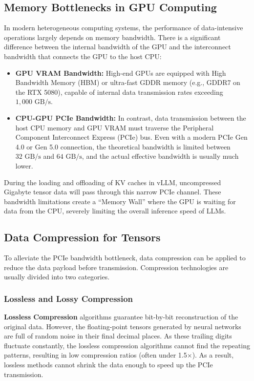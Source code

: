 \documentclass{polyu-comp}
\begin{document}
\subsection{Memory Bottlenecks in GPU Computing}
In modern heterogeneous computing systems, the performance of data-intensive operations largely depends on memory bandwidth. There is a significant difference between the internal bandwidth of the GPU and the interconnect bandwidth that connects the GPU to the host CPU:
\begin{itemize}
    \item \textbf{GPU VRAM Bandwidth:} High-end GPUs are equipped with High Bandwidth Memory (HBM) or ultra-fast GDDR memory (e.g., GDDR7 on the RTX 5080), capable of internal data transmission rates exceeding $1,000\text{ GB/s}$.
    \item \textbf{CPU-GPU PCIe Bandwidth:} In contrast, data transmission between the host CPU memory and GPU VRAM must traverse the Peripheral Component Interconnect Express (PCIe) bus. Even with a modern PCIe Gen 4.0 or Gen 5.0 connection, the theoretical bandwidth is limited between $32\text{ GB/s}$ and $64\text{ GB/s}$, and the actual effective bandwidth is usually much lower.
\end{itemize}
During the loading and offloading of KV caches in vLLM, uncompressed Gigabyte tensor data will pass through this narrow PCIe channel. These bandwidth limitations create a ``Memory Wall'' \cite{10.1145/3458817.3476205} where the GPU is waiting for data from the CPU, severely limiting the overall inference speed of LLMs.

\subsection{Data Compression for Tensors}
To alleviate the PCIe bandwidth bottleneck, data compression can be applied to reduce the data payload before transmission. Compression technologies are usually divided into two categories.

\subsubsection{Lossless and Lossy Compression}
\textbf{Lossless Compression} algorithms \cite{alma991085870187406532} guarantee bit-by-bit reconstruction of the original data. However, the floating-point tensors generated by neural networks are full of random noise in their final decimal places. As these trailing digits fluctuate constantly, the lossless compression algorithms cannot find the repeating patterns, resulting in low compression ratios (often under 1.5$\times$). As a result, lossless methods cannot shrink the data enough to speed up the PCIe transmission.
\end{document}
